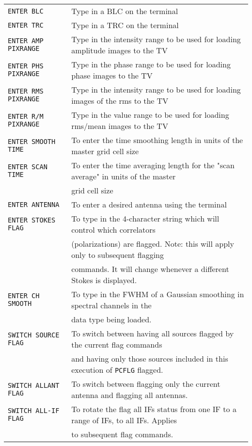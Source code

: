 \documentclass[twoside]{article}
\begin{document}
\begin{center}
\begin{tabular}{|l|l|}\hline
{\tt ENTER BLC          } & Type in a BLC on the terminal\\
{\tt ENTER TRC          } & Type in a TRC on the terminal\\
{\tt ENTER AMP PIXRANGE } & Type in the intensity range to be used for
                         loading amplitude images to the TV\\
{\tt ENTER PHS PIXRANGE } & Type in the phase range to be used for loading
                         phase images to the TV\\
{\tt ENTER RMS PIXRANGE } & Type in the intensity range to be used for
                         loading images of the rms to the TV\\
{\tt ENTER R/M PIXRANGE } & Type in the value range to be used for loading
                         rms/mean images to the TV\\
{\tt ENTER SMOOTH TIME  } & To enter the time smoothing length in units of
                         the master grid cell size\\
{\tt ENTER SCAN TIME    } & To enter the time averaging length for the
                         "scan average" in units of the master\\
                          & grid cell size\\
{\tt ENTER ANTENNA      } & To enter a desired antenna using the terminal\\
{\tt ENTER STOKES FLAG  } & To type in the 4-character string which will
                         control which correlators\\
                          & (polarizations) are flagged.  Note: this
                         will apply only to subsequent flagging\\
                          & commands. It will change whenever a
                          different Stokes is displayed.\\
{\tt ENTER CH SMOOTH    } & To type in the FWHM of a Gaussian smoothing
                         in spectral channels in the\\
                          & data type being loaded.\\
{\tt SWITCH SOURCE FLAG } & To switch between having all sources flagged by
                         the current flag commands\\
                          & and having only those sources included in this
                          execution of {\tt PCFLG} flagged.\\
{\tt SWITCH ALLANT FLAG } & To switch between flagging only the current
                         antenna and flagging all antennas.\\
{\tt SWITCH ALL-IF FLAG } & To rotate the flag all IFs status from one IF
                         to a range of IFs, to all IFs.  Applies\\
                          & to subsequent flag commands.\\ \hline
\end{tabular}
\end{center}
\end{document}
